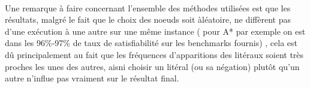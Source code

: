 \paragraph{}
Une remarque à faire concernant l'ensemble des méthodes utilisées est que les résultats, malgré le fait que le choix des noeuds soit àléatoire, ne diffèrent pas d'une exécution à une autre sur une même instance ( pour A* par exemple on est dans les 96\%-97\% de taux de satisfiabilité sur les benchmarks fournis) , cela est dû principalement au fait que les fréquences d'apparitions des litéraux soient très proches les unes des autres, aisni choisir un litéral (ou sa négation) plutôt qu'un autre n'influe pas vraiment sur le résultat final.